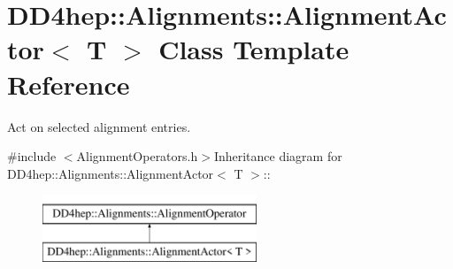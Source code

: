 \hypertarget{class_d_d4hep_1_1_alignments_1_1_alignment_actor}{
\section{DD4hep::Alignments::AlignmentActor$<$ T $>$ Class Template Reference}
\label{class_d_d4hep_1_1_alignments_1_1_alignment_actor}
}


Act on selected alignment entries.  


{\ttfamily \#include $<$AlignmentOperators.h$>$}Inheritance diagram for DD4hep::Alignments::AlignmentActor$<$ T $>$::\begin{figure}[H]
\begin{center}
\leavevmode
\includegraphics[height=2cm]{class_d_d4hep_1_1_alignments_1_1_alignment_actor}
\end{center}
\end{figure}
